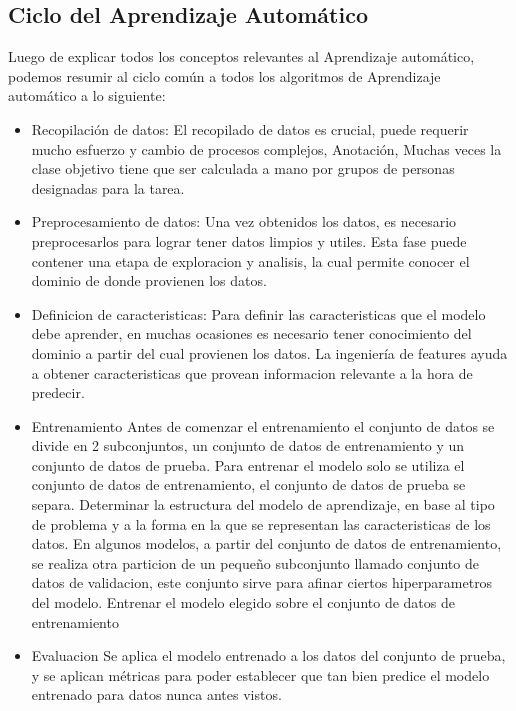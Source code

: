 \documentclass[a4paper,11pt,spanish]{book}
\begin{document}
    \subsection{Ciclo del Aprendizaje Automático}
      Luego de explicar todos los conceptos relevantes al Aprendizaje automático, podemos resumir al ciclo común a todos los algoritmos de Aprendizaje automático a lo siguiente: 
      \begin{itemize}
	\item Recopilación de datos:
	  El recopilado de datos es crucial, puede requerir mucho esfuerzo y cambio de procesos complejos, 
	  Anotación, Muchas veces la clase objetivo tiene que ser calculada a mano por grupos de personas designadas para la tarea.
	\item Preprocesamiento de datos: Una vez obtenidos los datos, es necesario preprocesarlos para lograr tener datos limpios y utiles. Esta fase puede contener una etapa 
	  de exploracion y analisis, la cual permite conocer el dominio de donde provienen los datos.  
	\item Definicion de caracteristicas: Para definir las caracteristicas que el modelo debe aprender, en muchas ocasiones es necesario tener conocimiento del dominio a partir del cual provienen los datos. 
	  La ingeniería de features ayuda a obtener caracteristicas que provean informacion relevante a la hora de predecir.
	\item Entrenamiento
	  \subitem Antes de comenzar el entrenamiento el conjunto de datos se divide en 2 subconjuntos, un conjunto de datos de entrenamiento y un conjunto de datos de prueba. 
	  \subitem Para entrenar el modelo solo se utiliza el conjunto de datos de entrenamiento, el conjunto de datos de prueba se separa.
	  \subitem Determinar la estructura del modelo de aprendizaje, en base al tipo de problema y a la forma en la que se representan las caracteristicas de los datos.
	  \subitem En algunos modelos, a partir del conjunto de datos de entrenamiento, se realiza otra particion de un pequeño subconjunto llamado conjunto de datos de validacion, este conjunto sirve 
	  para afinar ciertos hiperparametros del modelo.
	  \subitem Entrenar el modelo elegido sobre el conjunto de datos de entrenamiento
	\item Evaluacion
	  Se aplica el modelo entrenado a los datos del conjunto de prueba, y se aplican métricas para poder establecer que tan bien predice el modelo entrenado para datos nunca antes vistos.
      \end{itemize}
    
\end{document}
